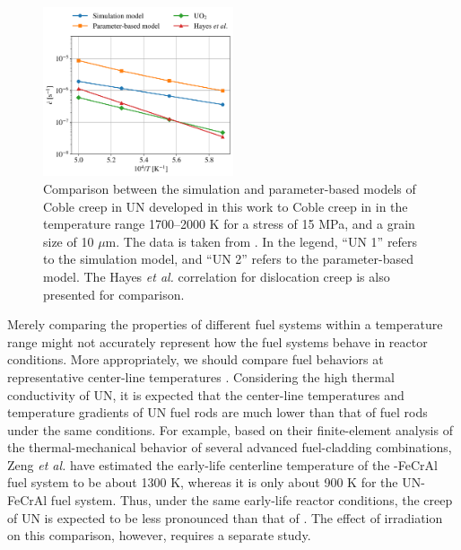 \documentclass[preprint, 12pt]{elsarticle}
\newcommand{\?}{\stackrel{?}{=}}
\begin{document}

\begin{figure}[h!]
    \centering
    \includegraphics[width=0.5\textwidth]{UNvsUO2.png}
    \caption{Comparison between the simulation and parameter-based models of Coble creep in UN developed in this work to Coble creep in  in the temperature range 1700--2000 K for a stress of 15 MPa, and a grain size of 10 $\mu$m. The  data is taken from \cite{Galvin2024b}. In the legend, ``UN 1'' refers to the simulation model, and ``UN 2'' refers to the parameter-based model. The Hayes \textit{et al.} \cite{Hayes1990II} correlation for dislocation creep is also presented for comparison.}
    \label{Fig:UNvsUO2}
\end{figure}

Merely comparing the properties of different fuel systems within a temperature range might not accurately represent how the fuel systems behave in reactor conditions. More appropriately, we should compare fuel behaviors at representative center-line temperatures \cite{Cheniour2020}. Considering the high thermal conductivity of UN, it is expected that the center-line temperatures and temperature gradients of UN fuel rods are much lower than that of  fuel rods under the same conditions. For example, based on their finite-element analysis of the thermal-mechanical behavior of several advanced fuel-cladding combinations, Zeng \textit{et al.} \cite{Zeng2021} have estimated the early-life centerline temperature of the -FeCrAl fuel system to be about 1300 K, whereas it is only about 900 K for the UN-FeCrAl fuel system. Thus, under the same early-life reactor conditions, the creep of UN is expected to be less pronounced than that of . The effect of irradiation on this comparison, however, requires a separate study.
\end{document}
